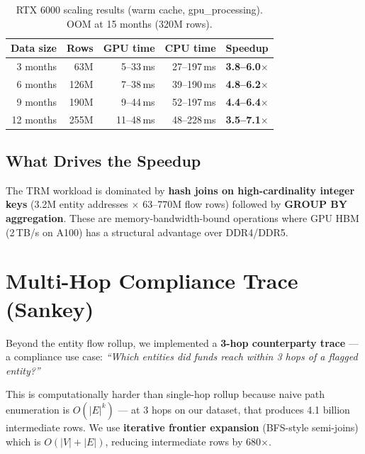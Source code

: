 \documentclass[11pt,a4paper]{article}
\begin{document}
\begin{table}[H]
\centering
\small
\begin{tabular}{@{}rrrrc@{}}
\toprule
\textbf{Data size} & \textbf{Rows} & \textbf{GPU time} & \textbf{CPU time} & \textbf{Speedup} \\
\midrule
3 months  & 63M  & 5--33\,ms  & 27--197\,ms  & \textbf{3.8--6.0$\times$} \\
6 months  & 126M & 7--38\,ms  & 39--190\,ms  & \textbf{4.8--6.2$\times$} \\
9 months  & 190M & 9--44\,ms  & 52--197\,ms  & \textbf{4.4--6.4$\times$} \\
12 months & 255M & 11--48\,ms & 48--228\,ms  & \textbf{3.5--7.1$\times$} \\
\bottomrule
\end{tabular}
\caption{RTX 6000 scaling results (warm cache, gpu\_processing). OOM at 15 months (320M rows).}
\label{tab:rtx6000-scaling}
\end{table}

\subsection*{What Drives the Speedup}

The TRM workload is dominated by \textbf{hash joins on high-cardinality integer
keys} (3.2M entity addresses $\times$ 63--770M flow rows) followed by
\textbf{GROUP BY aggregation}. These are memory-bandwidth-bound operations where
GPU HBM (2\,TB/s on A100) has a structural advantage over DDR4/DDR5.

\section{Multi-Hop Compliance Trace (Sankey)}

Beyond the entity flow rollup, we implemented a \textbf{3-hop counterparty
trace} --- a compliance use case: \textit{``Which entities did funds reach
within 3 hops of a flagged entity?''}

This is computationally harder than single-hop rollup because naive path
enumeration is $O(|E|^k)$ --- at 3 hops on our dataset, that produces 4.1
billion intermediate rows. We use \textbf{iterative frontier expansion}
(BFS-style semi-joins) which is $O(|V| + |E|)$, reducing intermediate rows
by 680$\times$.
\end{document}
